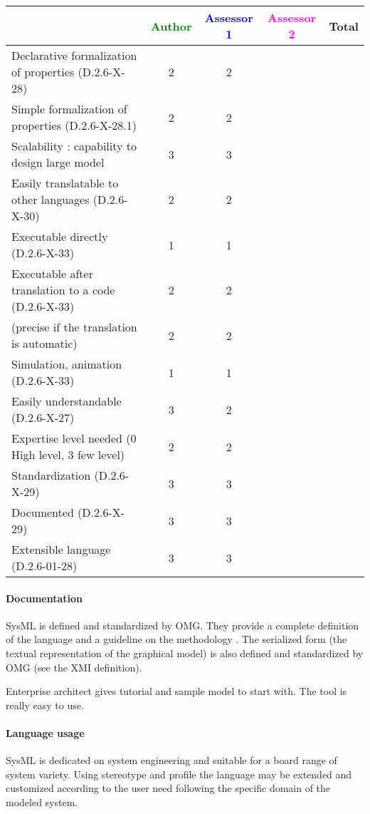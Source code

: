 \begin{tabular}{|l | c | c | c | c|}
\hline
& \textcolor{green}{Author} & \textcolor{blue}{Assessor 1} & \textcolor{magenta}{Assessor 2} & Total \\
\hline
Declarative formalization of properties (D.2.6-X-28) &2 & 2 & & \\
\hline
Simple formalization of properties (D.2.6-X-28.1) &2 &2 & & \\
\hline
Scalability : capability to design large model &3 &3 & & \\
\hline
Easily translatable to other languages (D.2.6-X-30) &2 &2 & & \\
\hline
Executable directly (D.2.6-X-33) &1 & 1& & \\
\hline
Executable after translation to a code (D.2.6-X-33) & 2 & 2& & \\
(precise if the translation is automatic) &2 & 2& & \\
\hline
Simulation, animation (D.2.6-X-33) &1 & 1& & \\
\hline
Easily understandable (D.2.6-X-27) &3 & 2& & \\
\hline
Expertise level needed (0 High level, 3 few level) &2 &2 & & \\
\hline
Standardization (D.2.6-X-29) &3 & 3& & \\
\hline
Documented (D.2.6-X-29) &3 & 3& & \\
\hline
Extensible language (D.2.6-01-28) &3 & 3& & \\
\hline
\end{tabular}


\paragraph{Documentation} 
SysML is  defined and standardized by OMG. They provide a complete
definition of the language and a guideline on the methodology
\cite{SysML}. The serialized form (the textual representation of the
graphical model) is also defined and standardized by OMG (see the XMI
definition).

Enterprise architect gives tutorial and sample model to start
with. The tool is really easy to use.

\paragraph{Language usage} 
SysML is dedicated on system engineering and suitable for a board range of
system variety. Using stereotype and profile the language may be
extended and customized according to the user need following the
specific domain of the modeled system.


